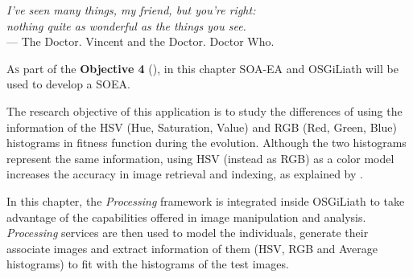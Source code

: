 \label{chap:art}


\begin{flushright}{\slshape
    I've seen many things, my friend, but you're right:
    \\nothing quite as wonderful as the things you see.} \\ \medskip
    --- {The Doctor. Vincent and the Doctor. Doctor Who.}
\end{flushright}


\minitoc\mtcskip
\vfill




\lettrine{A}{s} part of the \textbf{Objective 4} (\objectiveresearch), in this chapter SOA-EA and OSGiLiath will be used to develop a SOEA. 

The research objective of this application is to study the differences %
of using the information of the HSV (Hue, Saturation, Value) and RGB (Red,
Green, Blue) histograms in fitness function during the evolution. Although the two
histograms represent the same information, using HSV (instead as RGB)
as a color model increases the accuracy in image retrieval and
indexing, as explained by 
\cite{COLORDIFFERENCES}.










In this chapter, the {\em Processing} \cite{PROCESSING} framework is
integrated inside OSGiLiath %
to take advantage of the capabilities offered in image manipulation and analysis. 
{\em Processing} services are then used  to model the
individuals, generate their associate images and extract information
of them (HSV, RGB and Average histograms) to fit with the histograms
of the test images.



